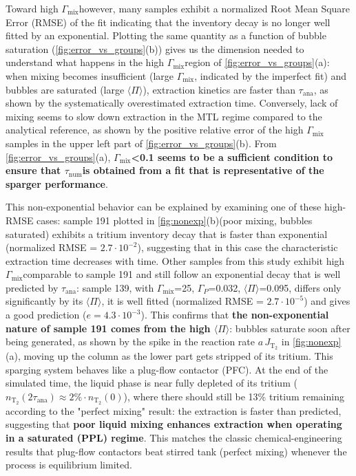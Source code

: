 \documentclass[a4paper,11pt,oneside]{report}
\newcommand{\JT}{\ensuremath{J_\mathrm{T_2}}}
\newcommand{\NT}{\ensuremath{n_\mathrm{T_2}}}
\newcommand{\Tana}{\ensuremath{\tau_\mathrm{ana}}}
\newcommand{\Tnum}{\ensuremath{\tau_\mathrm{num}}}
\newcommand{\Gmix}{\ensuremath{\Gamma_\mathrm{mix}}}
\newcommand{\Gp}{\ensuremath{\Gamma_P}}
\newcommand{\PI}{\ensuremath{\langle \Pi \rangle}}
\begin{document}
Toward high \Gmix however, many samples exhibit a normalized Root Mean Square Error (RMSE) of the fit indicating that the inventory decay is no longer well fitted by an exponential. Plotting the same quantity as a function of bubble saturation (\cref{fig:error_vs_groups}(b)) gives us the dimension needed to understand what happens in the high \Gmix region of \cref{fig:error_vs_groups}(a): when mixing becomes insufficient (large \Gmix, indicated by the imperfect fit) and bubbles are saturated (large \PI), extraction kinetics are faster than \Tana, as shown by the systematically overestimated extraction time. Conversely, lack of mixing seems to slow down extraction in the MTL regime compared to the analytical reference, as shown by the positive relative error of the high \Gmix samples in the upper left part of \cref{fig:error_vs_groups}(b). From \cref{fig:error_vs_groups}(a), \textbf{\Gmix<0.1 seems to be a sufficient condition to ensure that \Tnum is obtained from a fit that is representative of the sparger performance}. 


This non-exponential behavior can be explained by examining one of these high-RMSE cases: sample 191 plotted in \cref{fig:nonexp}(b)(poor mixing, bubbles saturated) exhibits a tritium inventory decay that is faster than exponential (normalized RMSE = $2.7\cdot10^{-2}$), suggesting that in this case the characteristic extraction time decreases with time. Other samples from this study exhibit high \Gmix comparable to sample 191 and still follow an exponential decay that is well predicted by \Tana: sample 139, with \Gmix=25, \Gp=0.032, \PI=0.095, differs only significantly by its \PI, it is well fitted (normalized RMSE = $2.7\cdot10^{-5}$) and gives a good prediction ($e=4.3\cdot10^{-3}$). This confirms that \textbf{the non-exponential nature of sample 191 comes from the high \PI}: bubbles saturate soon after being generated, as shown by the spike in the reaction rate $a\,\JT$ in \cref{fig:nonexp}(a), moving up the column as the lower part gets stripped of its tritium. This sparging system behaves like a plug-flow contactor (PFC). At the end of the simulated time, the liquid phase is near fully depleted of its tritium ($\NT(2\Tana)\approx2\%\cdot\NT(0)$), where there should still be 13\% tritium remaining according to the "perfect mixing" result: the extraction is faster than predicted, suggesting that \textbf{poor liquid mixing enhances extraction when operating in a saturated (PPL) regime}. This matches the classic chemical-engineering results that plug-flow contactors beat stirred tank (perfect mixing) whenever the process is equilibrium limited\cite{mohan_experimental_2010}. 
\end{document}

